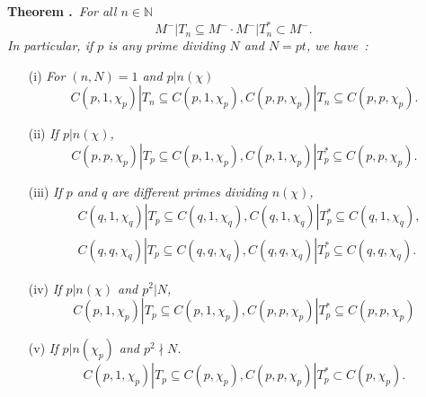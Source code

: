 \medskip
\noindent
{\bf Theorem .\label{art10-thm7.1}}~{\em For all $n\in \mathbb{N}$}
\setcounter{equation}{0}
\begin{equation}
M^{-}|T_{n}\subseteq M^{-}\cdot M^{-}|T^{*}_{n}\subset M^{-}.\label{art10-eq7.1}
\end{equation}
{\em In particular, if $p$ is any prime dividing $N$ and $N=pt$, we have~:}
\begin{itemize}
\item[(i)] {\em For $(n,N)=1$ and $p|n(\chi)$}
\begin{equation}
C(p,1,\chi_{p})|T_{n}\subseteq C(p,1,\chi_{p}),C(p,p,\chi_{p})|T_{n}\subseteq C(p,p,\chi_{p}).\label{art10-eq7.2}
\end{equation}

\item[(ii)] {\em If $p|n(\chi)$,}
\begin{equation}
C(p,p,\chi_{p})|T_{p}\subseteq C(p,1,\chi_{p}),C(p,1,\chi_{p})|T^{*}_{p}\subseteq C(p,p,\chi_{p}).\label{art10-eq7.3}
\end{equation}

\item[(iii)] {\em If $p$ and $q$ are different primes dividing $n(\chi)$,}
\begin{align}
& C(q,1,\chi_{q})|T_{p}\subseteq C(q,1,\chi_{q}),C(q,1,\chi_{q})|T^{*}_{p}\subseteq C(q,1,\chi_{q}),\label{art10-eq7.4}\\
& C(q,q,\chi_{q})|T_{p}\subseteq C(q,q,\chi_{q}), C(q,q,\chi_{q})|T^{*}_{p}\subseteq C(q,q,\chi_{q}).\label{art10-eq7.5}
\end{align}

\item[(iv)] {\em If $p|n(\chi)$ and $p^{2}|N$,}
\begin{equation}
C(p,1,\chi_{p})|T_{p}\subseteq C(p,1,\chi_{p}), C(p,p,\chi_{p})|T^{*}_{p}\subseteq C(p,p,\chi_{p})\label{art10-eq7.6}
\end{equation}

\item[(v)] {\em If $p|n(\chi_{p})$ and $p^{2}\nmid N$.}
\begin{equation}
C(p,1,\chi_{p})|T_{p}\subseteq C(p,\chi_{p}),C(p,p,\chi_{p})|T^{*}_{p}\subset C(p,\chi_{p}).\label{art10-eq7.7}
\end{equation}
\end{itemize}


